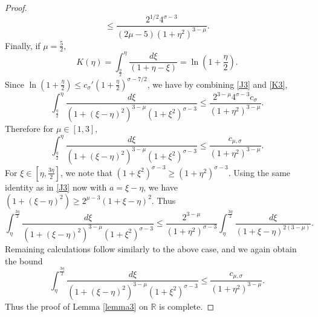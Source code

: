 \documentclass[reqno]{amsart}
\theoremstyle{plain}
\numberwithin{equation}{section}
\begin{document}
\begin{proof}
\begin{equation}
        \leq \frac{2^{1/2}4^{\sigma-3}}{(2\mu-5)(1+\eta^2)^{3-\mu}}.
\end{equation}
Finally, if $\mu = \frac52,$ 
\begin{equation}\label{K3}
    K(\eta) = 
        \int_{\frac{\eta}{2}}^{\eta}\frac{d\xi}{(1+\eta-\xi)}
        = \ln\left(1 + \frac\eta2\right).
\end{equation}
Since $\ln\left(1 + \frac\eta2\right) \leq c_{\sigma}'\left(1 + \frac\eta2\right)^{\sigma-7/2}$, we have by combining \eqref{J3} and \eqref{K3}, 
\begin{equation}
    \int_{\frac{\eta}{2}}^{\eta}\frac{d \xi}{(1+(\xi - \eta)^2)^{3-\mu}(1 + \xi^2)^{\sigma-3}} 
        \leq \frac{2^{3-\mu}4^{\sigma-3}c_{\sigma}}{(1+\eta^2)^{3-\mu}}.
\end{equation}
Therefore for $\mu \in \left[1,3\right],$
\begin{equation}
    \int_{\frac{\eta}{2}}^{\eta}\frac{d \xi}{(1+(\xi - \eta)^2)^{3-\mu}(1 + \xi^2)^{\sigma-3}} 
        \leq \frac{c_{\mu,\sigma}}{(1+\eta^2)^{3-\mu}}.
\end{equation}
For $\xi \in \left[\eta,\frac{3\eta}{2}\right]$, we note that $(1+\xi^2)^{\sigma - 3} \geq (1 + \eta^2)^{\sigma - 3}$. 
Using the same identity as in \eqref{J3} now with $a = \xi - \eta$, we have $(1 + (\xi - \eta)^2) \geq 2^{\mu-3}(1 + \xi - \eta)^2$. 
Thus
\begin{equation}\label{J4}
    \int_{\eta}^{\frac{3\eta}{2}}\frac{d \xi}{(1+(\xi - \eta)^2)^{3-\mu}(1 + \xi^2)^{\sigma-3}} 
        \leq \frac{2^{3-\mu}}{(1+\eta^2)^{\sigma-3}}\int^{\frac{3\eta}{2}}_{\eta}\frac{d\xi}{(1+\xi-\eta)^{2(3-\mu)}}.
\end{equation}
Remaining calculations follow similarly to the above case, and we again obtain the bound 
\begin{equation}
    \int_{\eta}^{\frac{3\eta}{2}}\frac{d \xi}{(1+(\xi - \eta)^2)^{3-\mu}(1 + \xi^2)^{\sigma-3}} 
        \leq \frac{c_{\mu,\sigma}}{(1+\eta^2)^{3-\mu}}.
\end{equation}
Thus the proof of Lemma \ref{lemma3} on $\mathbb{R}$ is complete.
\end{proof}
\end{document}
